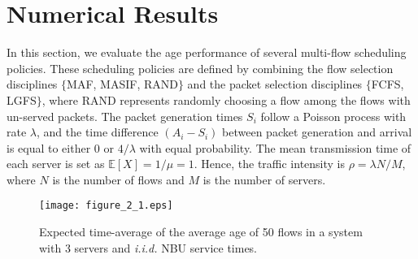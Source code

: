 \section{Numerical Results}
In this section, we evaluate the age performance of several multi-flow scheduling policies. These scheduling policies are defined by combining the flow selection disciplines $\{$MAF, MASIF, RAND$\}$ and the packet selection disciplines $\{$FCFS, LGFS$\}$, where  RAND represents randomly choosing a flow among the flows with un-served packets. The packet generation times $S_i$ follow a Poisson process with rate $\lambda$, and the time difference $(A_i-S_i)$ between packet generation and arrival is equal to either 0 or $4/\lambda$ with equal probability. The mean transmission time of each server is set as $\mathbb{E}[X]=1/\mu=1$. Hence, the traffic intensity is $\rho =  \lambda N/M$, where $N$ is the number of flows and $M$ is the number of servers.

\begin{figure}
\centering 
\texttt{[image: figure\_2\_1.eps]} 
\caption{Expected time-average of the average age of 50 flows in a system with 3 servers and \emph{i.i.d.} NBU service times.}
\vspace{-5mm}

\label{fig_simulation2} 
\end{figure} 

